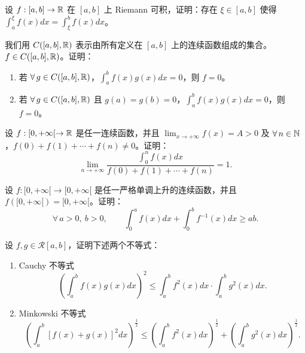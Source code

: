\begin{exercise}
	\item 设 \(f:[a,b]\to\mathbb{R}\) 在 \([a,b]\) 上 Riemann 可积，证明：存在 \(\xi\in[a,b]\) 使得 \(\displaystyle\int_a^\xi f(x)dx=\int_\xi^b f(x)dx\)。
\end{exercise}

\begin{exercise}
	\item 我们用 \(C([a,b],\mathbb{R})\) 表示由所有定义在 \([a,b]\) 上的连续函数组成的集合。\(f\in C([a,b],\mathbb{R})\)。证明：
	\begin{enumerate}[label=\arabic*)]
		\item 若 \(\forall\,g\in C([a,b],\mathbb{R})\)，\(\displaystyle\int_a^b f(x)g(x)dx=0\)，则 \(f=0\)。
		\item 若 \(\forall\,g\in C([a,b],\mathbb{R})\) 且 \(g(a)=g(b)=0\)，\(\displaystyle\int_a^b f(x)g(x)dx=0\)，则 \(f=0\)。
	\end{enumerate}
\end{exercise}

\begin{exercise}
	\item 设 \(f:[0,+\infty[\to\mathbb{R}\) 是任一连续函数，并且 \(\lim_{x\to+\infty}f(x)=A>0\) 及 \(\forall\,n\in\mathbb{N}\)，\(f(0)+f(1)+\cdots+f(n)\neq0\)。证明：
	\[
	\lim_{n\to+\infty}\frac{\int_0^n f(x)dx}{f(0)+f(1)+\cdots+f(n)}=1.
	\]
\end{exercise}

\begin{exercise}
	\item 设 \(f:[0,+\infty[\to[0,+\infty[\) 是任一严格单调上升的连续函数，并且 \(f([0,+\infty[)=[0,+\infty[\)。证明：
	\[
	\forall\,a>0,\ b>0,\qquad\int_0^a f(x)dx+\int_0^b f^{-1}(x)dx\ge ab.
	\]
\end{exercise}

\begin{exercise}
	\item 设 \(f,g\in\mathscr{R}[a,b]\)，证明下述两个不等式：
	\begin{enumerate}[label=\arabic*)]
		\item Cauchy 不等式
		\[
		\left(\int_a^b f(x)g(x)dx\right)^2\le\int_a^b f^2(x)dx\cdot\int_a^b g^2(x)dx.
		\]
		\item Minkowski 不等式
		\[
		\left(\int_a^b[f(x)+g(x)]^2dx\right)^{\frac12}\le\left(\int_a^b f^2(x)dx\right)^{\frac12}+\left(\int_a^b g^2(x)dx\right)^{\frac12}.
		\]
	\end{enumerate}
\end{exercise}

